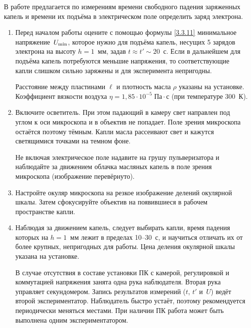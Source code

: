 \begin{lab:task}

В работе предлагается по измерениям времени свободного падения заряженных капель
и времени их подъёма в электрическом поле определить заряд электрона.

\begin{enumerate}

\item Перед началом работы оцените с помощью формулы \eqref{3.3.11} 
минимальное напряжение~$U_{\rm min}$, которое нужно для подъёма капель, 
несущих 5 зарядов электрона на высоту $h=1$~мм, задав $t\approx t' \sim 20$~с. 
Если в дальнейшем для подъёма капель потребуются меньшие напряжения, 
то соответствующие капли слишком сильно заряжены и для эксперимента непригодны.

Расстояние между пластинами $\ell$ и плотность масла $\rho$ указаны на установке.
Коэффициент вязкости воздуха $\eta=1,85\cdot 10^{-5}\;\text{Па}\cdot \text{с}$
(при температуре 300~К).

\item Включите осветитель. При этом падающий в камеру свет направлен под углом к
оси микроскопа и в объектив не попадает. Поле зрения микроскопа остаётся поэтому
тёмным. Капли масла рассеивают свет и кажутся светящимися точками на темном
фоне.

Не включая электрическое поле  надавите на грушу
пульверизатора  и наблюдайте за движением облачка масляных капель в поле зрения
микроскопа (изображение перевёрнуто).

\item Настройте окуляр микроскопа на резкое изображение делений окулярной шкалы.
Затем сфокусируйте объектив на появившиеся в рабочем пространстве капли.

\item Наблюдая за движением капель, следует выбирать капли, время падения
которых на $h=1$~мм лежит в пределах 10--30~с, и научиться отличать 
их от более крупных, непригодных для работы. Цена деления окулярной шкалы 
указана на установке.

В случае отсутствия в составе установки ПК с камерой, регулировкой и коммутацией
напряжения занята одна рука наблюдателя. Вторая рука управляет секундомером.
Запись результатов измерений ($t$, $t'$ и~$U$) ведёт второй экспериментатор.
Наблюдатель быстро устаёт, поэтому рекомендуется периодически меняться местами.
При наличии ПК работа может быть выполнена одним экспериментатором.


\end{enumerate}
\end{lab:task}
